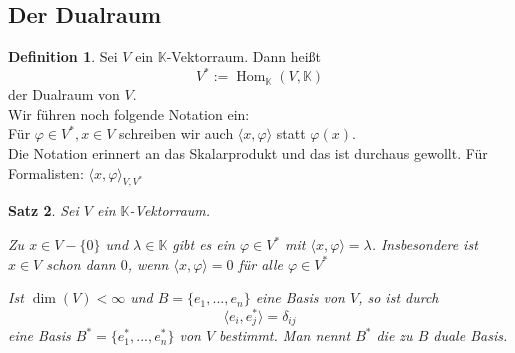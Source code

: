 \documentclass[12pt,a4paper]{article}
\newtheorem{theorem}{Satz}
\theoremstyle{definition}
\newtheorem{definition}[theorem]{Definition}
\theoremstyle{remark}
\DeclareMathOperator{\Hom}{Hom}
\begin{document}
	\subsection{Der Dualraum}
	\begin{definition}
		Sei $V$ ein $\mathbb{K}$-Vektorraum. Dann heißt
		\begin{equation}
			V^* := \Hom_{\mathbb{K}}(V, \mathbb{K})
		\end{equation}
		der Dualraum von $V$. \\
		Wir führen noch folgende Notation ein: \\
		Für $\varphi \in V^*, x \in V$ schreiben wir auch $\langle x, \varphi \rangle$ statt $\varphi(x)$.\\
		Die Notation erinnert an das Skalarprodukt und das ist durchaus gewollt. Für Formalisten: $\langle x, \varphi \rangle_{V,V^*}$
	\end{definition}
	\begin{theorem}
		Sei $V$ ein $ \mathbb{K}$-Vektorraum.
		\begin{proofenum}
			\item 
				Zu $x \in V-\{ 0 \}$ und $\lambda \in \mathbb{K}$ gibt es ein $\varphi \in V^*$ mit $\langle x, \varphi \rangle = \lambda$. Insbesondere ist $x \in V$ schon dann $0$, wenn $\langle x, \varphi \rangle=0$ für alle $\varphi \in V^*$
			\item 
				Ist $\dim(V) < \infty$ und $B = \{ e_1,...,e_n \}$ eine Basis von $V$, so ist durch
				\begin{equation}
					\langle e_i, e_j^* \rangle = \delta_{ij}
				\end{equation}
				eine Basis $B^* = \{ e_1^*,...,e_n^* \}$ von $V$ bestimmt. Man nennt $B^*$ die zu $B$ duale Basis.
		\end{proofenum}
	\end{theorem}
\end{document}
